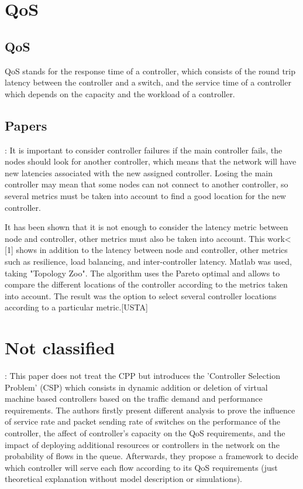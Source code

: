 \documentclass[a4paper,10pt]{article}
\begin{document}
\section{QoS}
\subsection{QoS}
QoS stands for the response time of a controller, which consists of the round trip latency between the controller and a switch, and the service time of a controller which depends on the capacity and the workload of a controller.

\subsection{Papers}

\cite{HoGe14}: It is important to consider controller failures if the main controller fails, the nodes should look for another controller, which means that the network will have new latencies associated with the new assigned controller. Losing the main controller may mean that some nodes can not connect to another controller, so several metrics must be taken into account to find a good location for the new controller.

It has been shown that it is not enough to consider the latency metric between node and controller, other metrics must also be taken into account. This work< [1] shows in addition to the latency between node and controller, other metrics such as resilience, load balancing, and inter-controller latency. Matlab was used, taking "Topology Zoo". The algorithm uses the Pareto optimal and allows to compare the different locations of the controller according to the metrics taken into account. The result was the option to select several controller locations according to a particular metric.[USTA]

\section{Not classified}

\cite{SoXi17}: This paper does not treat the CPP but introduces the 'Controller Selection Problem' (CSP) which consists in dynamic addition or deletion of virtual machine based controllers based on the traffic demand and performance requirements. The authors firstly present different analysis to prove the influence of service rate and packet sending rate of switches on the performance of the controller, the affect of controller's capacity on the QoS requirements, and the impact of deploying additional resources or controllers in the network on the probability of flows in the queue. Afterwards, they propose a framework to decide which controller will serve each flow according to its QoS requirements (just theoretical explanation without model description or simulations). 
\end{document}
